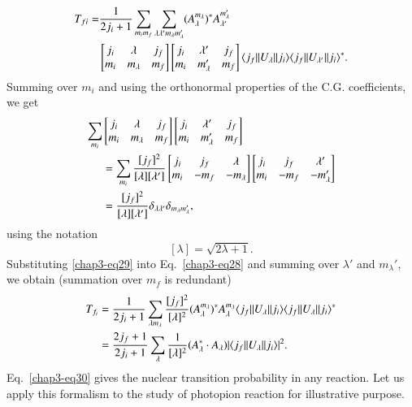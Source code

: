 \begin{align}
  T_{fi}  = & \frac{1}{2j_i+1} \sum_{m_i m_f} \sum_{\lambda \lambda' m_\lambda m_\lambda'} (A_\lambda^{m_\lambda})^\ast A_{\lambda'}^{m_\lambda'}
  \notag \\
 &  \begin{bmatrix} j_i & \lambda & j_f \\ m_i & m_\lambda & m_f\end{bmatrix}
    \begin{bmatrix} j_i & \lambda' & j_f \\ m_i & m_\lambda' & m_f\end{bmatrix}
      \langle j_f || U_\lambda || j_i \rangle \langle j_f || U_{\lambda'} || j_i \rangle^\ast. \label{chap3-eq28}
\end{align}
Summing over $m_i$ and using the orthonormal properties of the C.G. coefficients, we get
\begin{align}
  \sum_{m_i} &
  \begin{bmatrix} j_i & \lambda & j_f\\ m_i & m_\lambda & m_f  \end{bmatrix}
  \begin{bmatrix} j_i & \lambda' & j_f \\ m_i & m_\lambda' & m_f\end{bmatrix} \notag \\
    & = \sum_{m_i} \frac{[j_f]^2}{[\lambda][\lambda']}
      \begin{bmatrix} j_i &  j_f  & \lambda \\ m_i &  -m_f & -m_\lambda\end{bmatrix}
      \begin{bmatrix} j_i &  j_f  & \lambda' \\ m_i &  -m_f & -m_\lambda'\end{bmatrix} \notag \\
    & = \frac{[j_f]^2}{[\lambda][\lambda']} \delta_{\lambda \lambda'} \delta_{m_\lambda m_\lambda'}, \label{chap3-eq29}    
\end{align}
using the notation
$$
[\lambda] = \sqrt{2 \lambda +1}.
$$
Substituting \eqref{chap3-eq29} into Eq.\ \eqref{chap3-eq28} and summing over $\lambda'$ and $m_\lambda'$, we obtain (summation over $m_f$ is redundant)
\begin{align}
  T_{f_i} & = \frac{1}{2j_i +1} \sum_{\lambda m_\lambda} \frac{[j_f]^2}{[\lambda]^2} (A_\lambda^{m_\lambda})^\ast A_\lambda^{m_\lambda} \langle j_f || U_\lambda || j_i \rangle \langle j_f || U_\lambda || j_i \rangle^\ast \notag \\
  & = \frac{2j_f+1}{2j_i+1} \sum_{\lambda} \frac{1}{[\lambda]^2} (A_\lambda^\ast \cdot A_\lambda)| \langle j_f || U_\lambda || j_i \rangle |^2. \label{chap3-eq30}
\end{align}
Eq.\ \eqref{chap3-eq30} gives the nuclear transition probability in any reaction. Let us apply this formalism to the study of photopion reaction for illustrative purpose.

